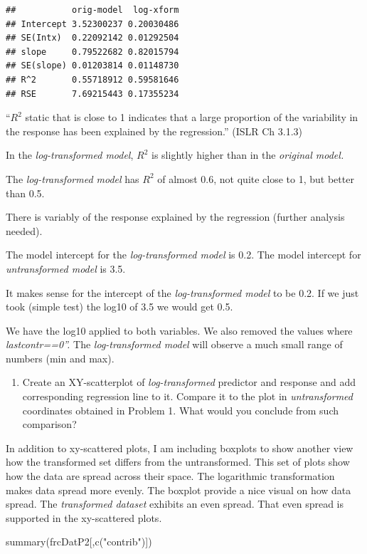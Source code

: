 \documentclass[
]{article}
\newenvironment{Shaded}{\begin{snugshade}}{\end{snugshade}}
\newcommand{\FunctionTok}[1]{\textcolor[rgb]{0.00,0.00,0.00}{#1}}
\newcommand{\NormalTok}[1]{#1}
\newcommand{\StringTok}[1]{\textcolor[rgb]{0.31,0.60,0.02}{#1}}
\providecommand{\tightlist}{%
  \setlength{\itemsep}{0pt}\setlength{\parskip}{0pt}}
\begin{document}
\begin{verbatim}
##           orig-model  log-xform
## Intercept 3.52300237 0.20030486
## SE(Intx)  0.22092142 0.01292504
## slope     0.79522682 0.82015794
## SE(slope) 0.01203814 0.01148730
## R^2       0.55718912 0.59581646
## RSE       7.69215443 0.17355234
\end{verbatim}

``\(R^2\) static that is close to 1 indicates that a large proportion of
the variability in the response has been explained by the regression.''
(ISLR Ch 3.1.3)

In the \emph{log-transformed model}, \(R^2\) is slightly higher than in
the \emph{original model.}

The \emph{log-transformed model} has \(R^2\) of almost 0.6, not quite
close to 1, but better than 0.5.

There is variably of the response explained by the regression (further
analysis needed).

The model intercept for the \emph{log-transformed model} is 0.2. The
model intercept for \emph{untransformed model} is 3.5.

It makes sense for the intercept of the \emph{log-transformed model} to
be 0.2. If we just took (simple test) the log10 of 3.5 we would get 0.5.

We have the log10 applied to both variables. We also removed the values
where \emph{lastcontr==0''.} The \emph{log-transformed model} will
observe a much small range of numbers (min and max).

\begin{enumerate}
\def\labelenumi{\arabic{enumi}.}
\setcounter{enumi}{1}
\tightlist
\item
  Create an XY-scatterplot of \emph{log-transformed} predictor and
  response and add corresponding regression line to it. Compare it to
  the plot in \emph{untransformed} coordinates obtained in Problem 1.
  What would you conclude from such comparison?
\end{enumerate}

In addition to xy-scattered plots, I am including boxplots to show
another view how the transformed set differs from the untransformed.
This set of plots show how the data are spread across their space. The
logarithmic transformation makes data spread more evenly. The boxplot
provide a nice visual on how data spread. The \emph{transformed dataset}
exhibits an even spread. That even spread is supported in the
xy-scattered plots.

\begin{Shaded}
\begin{Highlighting}[]
\FunctionTok{summary}\NormalTok{(frcDatP2[,}\FunctionTok{c}\NormalTok{(}\StringTok{"contrib"}\NormalTok{)])}
\end{Highlighting}
\end{Shaded}
\end{document}
